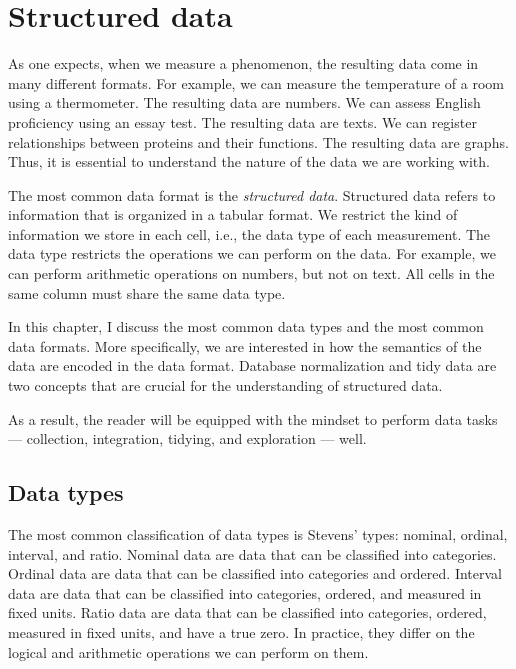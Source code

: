 \chapter{Structured data}
\label{chap:data}

As one expects, when we measure a phenomenon, the resulting data come in many different
formats.  For example, we can measure the temperature of a room using a thermometer.  The
resulting data are numbers.  We can assess English proficiency using an essay test.  The
resulting data are texts.  We can register relationships between proteins and their
functions.  The resulting data are graphs.  Thus, it is essential to understand the nature
of the data we are working with.

The most common data format is the \emph{structured data}.  Structured data refers to
information that is organized in a tabular format.
We restrict the kind of information we store in each cell, i.e., the data type of each
measurement.  The data type restricts the operations we can
perform on the data.  For example, we can perform arithmetic operations on numbers, but
not on text.  All cells in the same column must share the same data type.

In this chapter, I discuss the most common data types and the most common data formats.
More specifically, we are interested in how the semantics of the data are encoded in the
data format.  Database normalization and tidy data are two concepts that are crucial for
the understanding of structured data.

As a result, the reader will be equipped with the mindset to perform data tasks
--- collection, integration, tidying, and exploration --- well.

\section{Data types}

The most common classification of data types is Stevens' types: nominal, ordinal,
interval, and ratio.  Nominal data are data that can be classified into categories.
Ordinal data are data that can be classified into categories and ordered.  Interval data
are data that can be classified into categories, ordered, and measured in fixed units.
Ratio data are data that can be classified into categories, ordered, measured in fixed
units, and have a true zero.  In practice, they differ on the logical and arithmetic operations
we can perform on them.


